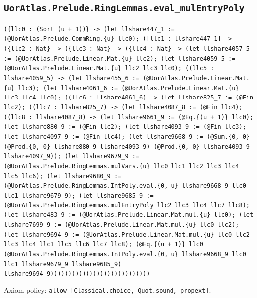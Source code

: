 \documentclass[11pt]{article}
\begin{document}
\subsection*{\texttt{UorAtlas.Prelude.RingLemmas.eval\_mulEntryPoly}}
\noindent\texttt{(\{llc0 : (Sort (u + 1))\} -> (let llshare447\_1 := (@UorAtlas.Prelude.CommRing.\{u\} llc0); ([llc1 : llshare447\_1] -> (\{llc2 : Nat\} -> (\{llc3 : Nat\} -> (\{llc4 : Nat\} -> (let llshare4057\_5 := (@UorAtlas.Prelude.Linear.Mat.\{u\} llc2); (let llshare4059\_5 := (@UorAtlas.Prelude.Linear.Mat.\{u\} llc2 llc3 llc0); ((llc5 : llshare4059\_5) -> (let llshare455\_6 := (@UorAtlas.Prelude.Linear.Mat.\{u\} llc3); (let llshare4061\_6 := (@UorAtlas.Prelude.Linear.Mat.\{u\} llc3 llc4 llc0); ((llc6 : llshare4061\_6) -> (let llshare825\_7 := (@Fin llc2); ((llc7 : llshare825\_7) -> (let llshare4087\_8 := (@Fin llc4); ((llc8 : llshare4087\_8) -> (let llshare9661\_9 := (@Eq.\{(u + 1)\} llc0); (let llshare880\_9 := (@Fin llc2); (let llshare4093\_9 := (@Fin llc3); (let llshare4097\_9 := (@Fin llc4); (let llshare9668\_9 := (@Sum.\{0, 0\} (@Prod.\{0, 0\} llshare880\_9 llshare4093\_9) (@Prod.\{0, 0\} llshare4093\_9 llshare4097\_9)); (let llshare9679\_9 := (@UorAtlas.Prelude.RingLemmas.mulVars.\{u\} llc0 llc1 llc2 llc3 llc4 llc5 llc6); (let llshare9680\_9 := (@UorAtlas.Prelude.RingLemmas.IntPoly.eval.\{0, u\} llshare9668\_9 llc0 llc1 llshare9679\_9); (let llshare9685\_9 := (@UorAtlas.Prelude.RingLemmas.mulEntryPoly llc2 llc3 llc4 llc7 llc8); (let llshare483\_9 := (@UorAtlas.Prelude.Linear.Mat.mul.\{u\} llc0); (let llshare7699\_9 := (@UorAtlas.Prelude.Linear.Mat.mul.\{u\} llc0 llc2); (let llshare9694\_9 := (@UorAtlas.Prelude.Linear.Mat.mul.\{u\} llc0 llc2 llc3 llc4 llc1 llc5 llc6 llc7 llc8); (@Eq.\{(u + 1)\} llc0 (@UorAtlas.Prelude.RingLemmas.IntPoly.eval.\{0, u\} llshare9668\_9 llc0 llc1 llshare9679\_9 llshare9685\_9) llshare9694\_9))))))))))))))))))))))))))))}\par
\noindent Axiom policy: \texttt{allow [Classical.choice, Quot.sound, propext]}.\par
\end{document}
